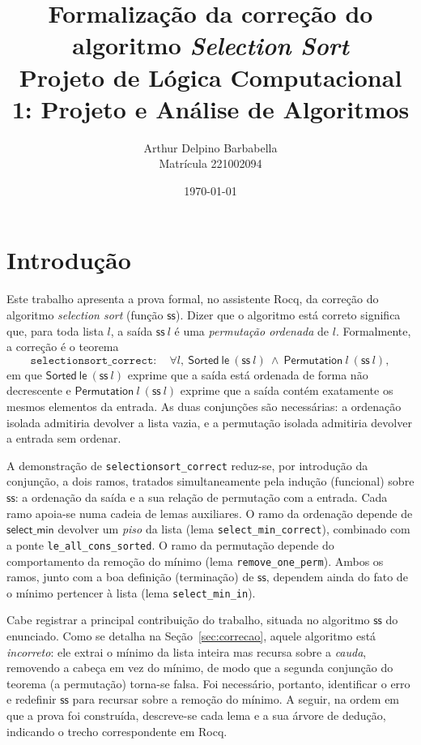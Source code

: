 \documentclass[11pt,a4paper]{article}
\title{Formaliza\c{c}\~ao da corre\c{c}\~ao do algoritmo \emph{Selection Sort}\\
\large Projeto de L\'ogica Computacional 1: Projeto e An\'alise de Algoritmos}
\author{Arthur Delpino Barbabella \\ Matr\'icula 221002094}
\date{\today}
\newcommand{\ssort}{\mathsf{ss}}
\newcommand{\selmin}{\mathsf{select\_min}}
\newcommand{\Sorted}{\mathsf{Sorted}}
\newcommand{\Perm}{\mathsf{Permutation}}
\newcommand{\lerel}{\mathsf{le}}
\begin{document}
\maketitle

\section{Introdu\c{c}\~ao}

Este trabalho apresenta a prova formal, no assistente Rocq, da corre\c{c}\~ao do
algoritmo \emph{selection sort} (fun\c{c}\~ao $\ssort$). Dizer que o algoritmo est\'a
correto significa que, para toda lista $l$, a sa\'ida $\ssort\ l$ \'e uma
\emph{permuta\c{c}\~ao ordenada} de $l$. Formalmente, a corre\c{c}\~ao \'e o
teorema
\[
  \texttt{selectionsort\_correct}:\quad
  \forall l,\ \Sorted\ \lerel\ (\ssort\ l)\ \land\ \Perm\ l\ (\ssort\ l),
\]
em que $\Sorted\ \lerel\ (\ssort\ l)$ exprime que a sa\'ida est\'a ordenada de forma
n\~ao decrescente e $\Perm\ l\ (\ssort\ l)$ exprime que a sa\'ida cont\'em
exatamente os mesmos elementos da entrada. As duas conjun\c{c}\~oes s\~ao
necess\'arias: a ordena\c{c}\~ao isolada admitiria devolver a lista vazia, e a
permuta\c{c}\~ao isolada admitiria devolver a entrada sem ordenar.

A demonstra\c{c}\~ao de \texttt{selectionsort\_correct} reduz-se, por
introdu\c{c}\~ao da conjun\c{c}\~ao, a dois ramos, tratados simultaneamente pela
indu\c{c}\~ao (funcional) sobre $\ssort$: a ordena\c{c}\~ao da sa\'ida e a sua
rela\c{c}\~ao de permuta\c{c}\~ao com a entrada. Cada ramo apoia-se numa cadeia de
lemas auxiliares. O ramo da ordena\c{c}\~ao depende de $\selmin$ devolver um
\emph{piso} da lista (lema \texttt{select\_min\_correct}), combinado com a ponte
\texttt{le\_all\_cons\_sorted}. O ramo da permuta\c{c}\~ao depende do comportamento
da remo\c{c}\~ao do m\'inimo (lema \texttt{remove\_one\_perm}). Ambos os ramos,
junto com a boa defini\c{c}\~ao (termina\c{c}\~ao) de $\ssort$, dependem ainda do
fato de o m\'inimo pertencer \`a lista (lema \texttt{select\_min\_in}).

Cabe registrar a principal contribui\c{c}\~ao do trabalho, situada no algoritmo
$\ssort$ do enunciado. Como se detalha na Se\c{c}\~ao~\ref{sec:correcao}, aquele
algoritmo est\'a \emph{incorreto}: ele extrai o m\'inimo da lista inteira mas
recursa sobre a \emph{cauda}, removendo a cabe\c{c}a em vez do m\'inimo, de modo
que a segunda conjun\c{c}\~ao do teorema (a permuta\c{c}\~ao) torna-se falsa. Foi
necess\'ario, portanto, identificar o erro e redefinir $\ssort$ para recursar
sobre a remo\c{c}\~ao do m\'inimo. A seguir, na ordem em que a prova foi
constru\'ida, descreve-se cada lema e a sua \'arvore de dedu\c{c}\~ao,
indicando o trecho correspondente em Rocq.
\end{document}
